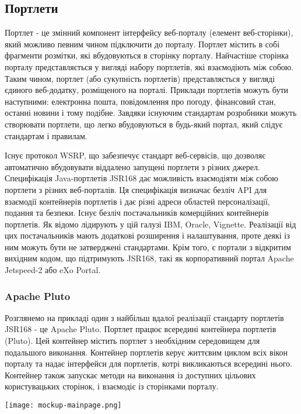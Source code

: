 \subsection{Портлети}
Портлет - це змінний компонент інтерфейсу веб-порталу (елемент веб-сторінки), який можливо певним чином підключити до порталу.
Портлет містить в собі фрагменти розмітки, які вбудовуються в сторінку порталу. 
Найчастіше сторінка порталу представляється у вигляді набору портлетів, які взаємодіють між собою. 
Таким чином, портлет (або сукупність портлетів) представляється у вигляді єдиного веб-додатку, розміщеного на порталі. 
Приклади портлетів можуть бути наступними: електронна пошта, повідомлення про погоду, фінансовий стан, останні новини і тому подібне.
Завдяки існуючим стандартам розробники можуть створювати портлети, що легко вбудовуються в будь-який портал, який слідує стандартам і правилам.
\par Існує протокол WSRP, що забезпечує стандарт веб-сервісів, що дозволяє автоматично вбудовувати віддалено запущені портлети з різних джерел.
Специфікація Java-портлетів JSR168 дає можливість взаємодіяти між собою портлети з різних веб-порталів. 
Ця специфікація визначає безліч API для взаємодії контейнерів портлетів і дає різні адреси областей персоналізації, подання та безпеки.
Існує безліч постачальників комерційних контейнерів портлетів. 
Як відомо лідирують у цій галузі IBM, Oracle, Vignette. 
Реалізації від цих постачальників мають додаткові розширення і налаштування, проте деякі із ним можуть бути не затверджені стандартами. 
Крім того, є портали з відкритим вихідним кодом, що підтримують JSR168, такі як корпоративний портал Apache Jetspeed-2 або eXo Portal.
\subsubsection{Apache Pluto}
Розглянемо на прикладі один з найбільш вдалої реалізації стандарту портлетів JSR168 - це Apache Pluto.
Портлет працює всередині контейнера портлетів (Pluto).
Цей контейнер містить портлет з необхідним середовищем для подальшого виконання.
Контейнер портлетів керує життєвим циклом всіх вікон порталу та надає інтерфейси для портлетів, котрі викликаються всередині нього.
Контейнер також запускає методи на виконання із доступних цільових користувацьких сторінок, і взаємодіє із сторінками порталу.  

        \begin{center}
		\texttt{[image: mockup-mainpage.png]}
	\end{center}

